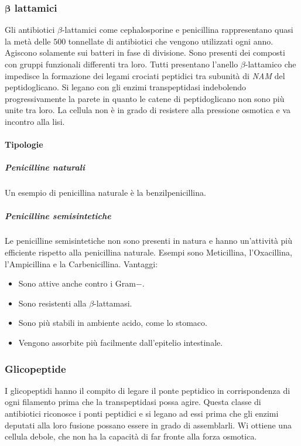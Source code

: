 		\subsubsection{$\mathbf{\beta}$ lattamici}
		Gli antibiotici $\beta$-lattamici come cephalosporine e penicillina rappresentano quasi la metà delle $500$ tonnellate di antibiotici che vengono utilizzati ogni anno. 
		Agiscono solamente sui batteri in fase di divisione. 
		Sono presenti dei composti con gruppi funzionali differenti tra loro. 
		Tutti presentano l'anello $\beta$-lattamico che impedisce la formazione dei legami crociati peptidici tra subunità di \emph{NAM} del peptidoglicano. 
		Si legano con gli enzimi transpeptidasi indebolendo progressivamente la parete in quanto le catene di peptidoglicano non sono più unite tra loro.
		La cellula non è in grado di resistere alla pressione osmotica e va incontro alla lisi.

			\paragraph{Tipologie}

				\subparagraph{Penicilline naturali}
				Un esempio di penicillina naturale \`e la benzilpenicillina.

				\subparagraph{Penicilline semisintetiche}
				Le penicilline semisintetiche non sono presenti in natura e hanno un'attivit\`a pi\`u efficiente rispetto alla penicillina naturale.
				Esempi sono Meticillina, l'Oxacillina, l'Ampicillina e la Carbenicillina.  
				Vantaggi:
				\begin{multicols}{2}
    					\begin{itemize}
        					\item Sono attive anche contro i Gram$-$. 
        					\item Sono resistenti alla $\beta$-lattamasi. 
        					\item Sono più stabili in ambiente acido, come lo stomaco. 
        					\item Vengono assorbite più facilmente dall'epitelio intestinale.
    					\end{itemize}
				\end{multicols}
		\subsubsection{Glicopeptide}
		I glicopeptidi hanno il compito di legare il ponte peptidico in corrispondenza di ogni filamento prima che la transpeptidasi possa agire. 
		Questa classe di antibiotici riconosce i ponti peptidici e si legano ad essi prima che gli enzimi deputati alla loro fusione possano essere in grado di assemblarli. 
		Wi ottiene una cellula debole, che non ha la capacità di far fronte alla forza osmotica.

